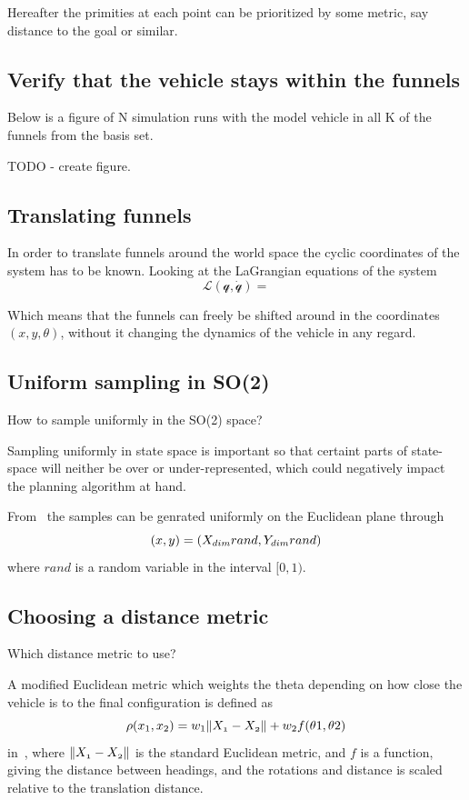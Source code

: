 Hereafter the primities at each point can be prioritized by some metric, say
distance to the goal or similar.

\subsection{Verify that the vehicle stays within the funnels}

Below is a figure of N simulation runs with the model vehicle in all K of the
funnels from the basis set.

TODO - create figure.

\subsection{Translating funnels}

In order to translate funnels around the world space the cyclic coordinates of
the system has to be known. Looking at the LaGrangian equations of the system
\begin{equation}
  \mathcal{L(q,\dot{q})} = 
\end{equation}

Which means that the funnels can freely be shifted around in the coordinates
\(\left( x, y, \theta \right)\), without it changing the dynamics of the vehicle
in any regard.

\subsection{Uniform sampling in SO(2)}

How to sample uniformly in the SO(2) space?

Sampling uniformly in state space is important so that certaint parts of
state-space will neither be over or under-represented, which could negatively
impact the planning algorithm at hand.

From~\cite{kuffnerEffectiveSamplingDistance2004} the samples can be genrated
uniformly on the Euclidean plane through
\[
  (x,y) = (\mathnormal{X}_{dim}rand, \mathnormal{Y}_{dim}rand)
\]
where \(rand\) is a random variable in the interval \([0,1)\).

\subsection{Choosing a distance metric}

Which distance metric to use?

A modified Euclidean metric which weights the theta depending on how close the
vehicle is to the final configuration is defined as
\[
  \rho(x_{1},x_{2}) = w_{1}\lVert\mathnormal{X_{1}} - \mathnormal{X_{2}}\rVert + w_{2}f(\theta{1},\theta{2})
\]
in~\cite{kuffnerEffectiveSamplingDistance2004}, where \(\lVert\mathnormal{X_{1}}
  - \mathnormal{X_{2}}\rVert\) is the standard Euclidean metric, and \(f\) is a
function, giving the distance between headings, and the rotations and distance
is scaled relative to the translation distance.

